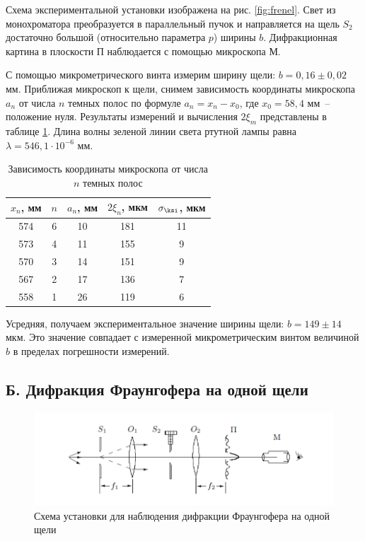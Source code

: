 \documentclass[a4paper,12pt]{article} %
\begin{document}
Схема экспериментальной установки изображена на рис. \ref{fig:frenel}. Свет из монохроматора преобразуется в параллельный пучок и направляется на щель $S_2$ достаточно большой (относительно параметра $p$) ширины $b$. Дифракционная картина в плоскости П наблюдается с помощью микроскопа М. 

С помощью микрометрического винта измерим ширину щели: $ b = 0,16 \pm 0,02 $ мм. Приближая микроскоп к щели, снимем зависимость координаты микроскопа $a_n$ от числа $ n $ темных полос по формуле $ a_n = x_n - x_0 $, где $ x_0 = 58,4 $ мм~-- положение нуля. Результаты измерений и вычисления $2\xi_m$ представлены в таблице \ref{tab:frenel}. Длина волны зеленой линии света ртутной лампы равна $ \lambda = 546,1 \cdot 10^{-6} $ мм.
\begin{table}[h!]
\caption{Зависимость координаты микроскопа от числа $ n $ темных полос}
\begin{center}
	\begin{tabular}{|c|c|c|c|c|}
		\hline
		$ x_n $, мм & $ n $ & $ a_n $, мм & $ 2\xi_n $, мкм &                    $\sigma_{\ksi}$, мкм \\
		\hline
		  574 & 6 & 10 & 181 & 11 \\
		573 & 4 & 11 & 155 & 9\\
		570 & 3 & 14 & 151 & 9 \\
            567 & 2 & 17 & 136 & 7\\
            558 & 1 & 26 & 119 & 6\\
		\hline
	\end{tabular}
\end{center}
\label{tab:frenel}
\end{table}

Усредняя, получаем экспериментальное значение ширины щели: $b = 149 \pm 14$ мкм. Это значение совпадает с измеренной микрометрическим винтом величиной $b$ в пределах погрешности измерений.

\subsection*{Б. Дифракция Фраунгофера на одной щели}
\begin{figure}[h]
    \centering
    \includegraphics{fraunhoferSetup.png}
    \caption{Схема установки для наблюдения дифракции Фраунгофера на одной щели}
    \label{fig:FH1hole}
\end{figure}
\end{document}
